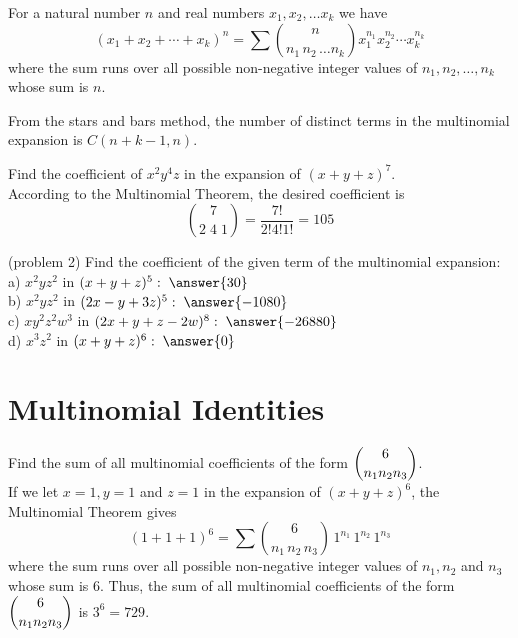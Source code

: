 \documentclass[handout]{ximera}
\begin{document}
\begin{theorem}
For a natural number $n$ and real numbers $x_1, x_2, \dots x_k$ we have
\[
(x_1 + x_2 + \cdots + x_k)^n = \sum \binom{n}{n_1 \, n_2 \, \dots n_k} x_1^{n_1}x_2^{n_2}\cdots x_k^{n_k}
\]
where the sum runs over all possible non-negative integer values of $n_1, n_2, \dots, n_k$ whose sum is $n$.
\end{theorem}

\begin{remark}
From the stars and bars method, the number of distinct terms in the 
multinomial expansion is $C(n+k-1, n)$.
\end{remark}


\begin{example}[example 2]
Find the coefficient of $x^2y^4z$ in the expansion of $(x+y+z)^7$.\\
According to the Multinomial Theorem, the desired coefficient is
\[
\binom{7}{2\;4\;1} = \frac{7!}{2!4!1!} = 105
\]
\end{example}

\begin{problem}(problem 2)
Find the coefficient of the given term of the multinomial expansion:\\
a) $x^2yz^2$ in $(x+y+z)^5: \; \answer{30}$\\
b) $x^2yz^2$ in $(2x-y+3z)^5: \; \answer{-1080}$\\
c) $xy^2z^2w^3$ in $(2x+y+z-2w)^8: \; \answer{-26880}$\\
d) $x^3z^2$ in $(x+y+z)^6: \; \answer{0}$\\
\end{problem}

\section{Multinomial Identities}

\begin{example}[example 3]
Find the sum of all multinomial coefficients of the form $\displaystyle \binom{6}{n_1 n_2 n_3}$.\\
If we let $x = 1, y = 1$ and $z = 1$ in the expansion of $(x+y+z)^6$, the Multinomial Theorem gives
\[
(1+1+1)^6 = \sum \binom{6}{n_1 \, n_2 \, n_3} \, 1^{n_1}\, 1^{n_2}\, 1^{n_3}
\]
where the sum runs over all possible non-negative integer values of $n_1, n_2$ and $n_3$ whose sum is 6.
Thus, the sum of all multinomial coefficients of the form $\displaystyle \binom{6}{n_1 n_2 n_3}$ is $3^6 = 729$.
\end{example}
\end{document}

